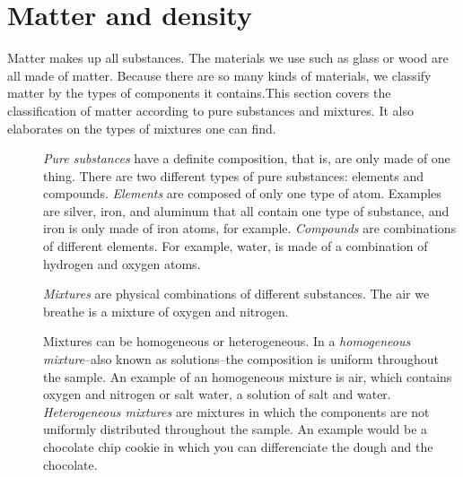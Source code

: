 \documentclass[main.tex]{subfiles}
\begin{document}
\section{Matter and density}
Matter makes up all substances. The materials we use such as glass or wood are all made of matter. Because there are so many kinds of materials, we classify matter by the types of components it contains.This section covers the classification of matter according to pure substances and mixtures. It also elaborates on the types of mixtures one can find. 
\begin{description}
\item[] \emph{Pure substances} have a definite composition, that is, are only made of one thing. There are two different types of pure substances: elements and compounds. \emph{Elements} are composed of only one type of atom. Examples are silver, iron, and aluminum that all contain one type of substance, and iron is only made of iron atoms, for example. \emph{Compounds} are combinations of different elements. For example, water,  is made of a combination of hydrogen and oxygen atoms.
\item[] \emph{Mixtures} are physical combinations of different substances. The air we breathe is a mixture of oxygen and nitrogen. 
\item[]Mixtures can be homogeneous or heterogeneous. In a \emph{homogeneous mixture}--also known as solutions--the composition is uniform throughout the sample. An example of an homogeneous mixture is air, which contains oxygen and nitrogen or salt water, a solution of salt and water. \emph{Heterogeneous mixtures} are mixtures in which the components are not uniformly distributed throughout the sample. An example would be a chocolate chip cookie in which you can differenciate the dough and the chocolate.


\end{description}
\end{document}

